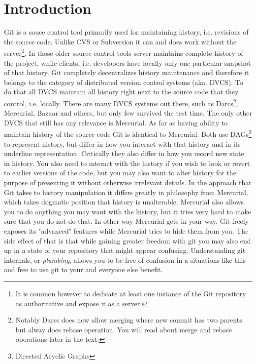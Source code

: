 \documentclass{article}
\theoremstyle{definition}
\begin{document}
       \section{Introduction}
        Git is a souce control tool primarily used for maintaining history, i.e. revisions of the source code. Unlike CVS or
        Subversion it can and does work without the server\footnote{It is common however to dedicate at least one instance
        of the Git repository as authoritative and expose it as a server.}. In those older source control tools server
        maintains complete history of the project, while clients, i.e. developers have locally only one particular snapshot
        of that history. Git completely decentralizes history maintenance and therefore it belongs to the category of
        distributed version control systems (aka. DVCS). To do that all DVCS maintain all history right next to the source
        code that they control, i.e. locally. There are many DVCS systems out there, such as Darcs\footnote{Notably Darcs
        does now allow merging where new commit has two parents but alway does rebase operation. You will read about merge
        and rebase operations later in the text.}, Mercurial, Bazaar and others, but only few survived the test time. The
        only other DVCS that still has any relevance is Mercurial. As far as having ability to maintain history of the
        source code Git is identical to Mercurial. Both use DAGs\footnote{Directed Acyclic Graphs} to represent history, but
        differ in how you interact with that history and in its underline representation. Critically they also differ in how
        you record new state in history. You also need to interact with the history if you wish to look or revert to earlier
        versions of the code, but you may also want to alter history for the purpose of presenting it without otherwise
        irrelevant details. In the approach that Git takes to history manipulation it differs greatly in philosophy from
        Mercurial, which takes dogmatic position that history is unalterable. Mercurial also allows you to do anything you
        may want with the history, but it tries very hard to make sure that you do not do that. In other way Mercurial gets
        in your way. Git freely exposes its "advanced" features while Mercurial tries to hide them from you. The side effect
        of that is that while gaining greater freedom with git you may also end up in a state of your repository that might
        appear confusing. Understanding git internals, or {\em plumbing}, allows you to be free of confusion in a situations
        like this and free to use git to your and everyone else benefit.
\end{document}
